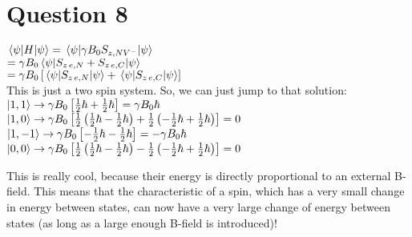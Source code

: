 \documentclass[12pt]{article}
\begin{document}
\section*{Question 8}
$\ev{H}{\psi} = \ev{\gamma B_0 S_{z,NV^-}}{\psi}$\vspace{0.5em}\\
\hspace*{3em}$= \gamma B_0 \ev{S_{z \, e, N} + S_{z \, e, C}}{\psi}$\vspace{0.5em}\\
\hspace*{3em}$=\gamma B_0 \left[\ev{S_{z \, e, N}}{\psi} + \ev{S_{z \, e, C}}{\psi}\right]$\vspace{0.5em}\\
This is just a two spin system. So, we can just jump to that solution:\vspace{0.5em}\\
$\ket{1,1} \rightarrow \gamma B_0 \left[\frac{1}{2}\hbar +\frac{1}{2}\hbar\right] = \gamma B_0 \hbar$\vspace{0.5em}\\
$\ket{1,0} \rightarrow \gamma B_0 \left[\frac{1}{2}\left(\frac{1}{2}\hbar - \frac{1}{2}\hbar\right) + \frac{1}{2}\left(-\frac{1}{2}\hbar + \frac{1}{2}\hbar\right)\right] = 0$\vspace{0.5em}\\
$\ket{1,-1} \rightarrow \gamma B_0 \left[-\frac{1}{2}\hbar -\frac{1}{2}\hbar\right] = -\gamma B_0 \hbar$\vspace{0.5em}\\
$\ket{0,0} \rightarrow \gamma B_0 \left[\frac{1}{2}\left(\frac{1}{2}\hbar -\frac{1}{2}\hbar\right) - \frac{1}{2}\left(-\frac{1}{2}\hbar + \frac{1}{2}\hbar \right)\right] = 0$

This is really cool, because their energy is directly proportional to an external B-field. This means that the characteristic of a spin, which has a very small change in energy between states, can now have a very large change of energy between states (as long as a large enough B-field is introduced)!
\end{document}
